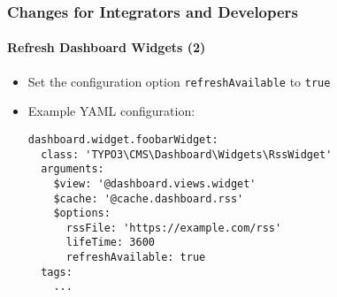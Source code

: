 %

\begin{frame}[fragile]
	\frametitle{Changes for Integrators and Developers}
	\framesubtitle{Refresh Dashboard Widgets (2)}


	\begin{itemize}
		\item Set the configuration option \texttt{refreshAvailable} to \texttt{true}
		\item Example YAML configuration:
\begin{lstlisting}
dashboard.widget.foobarWidget:
  class: 'TYPO3\CMS\Dashboard\Widgets\RssWidget'
  arguments:
    $view: '@dashboard.views.widget'
    $cache: '@cache.dashboard.rss'
    $options:
      rssFile: 'https://example.com/rss'
      lifeTime: 3600
      refreshAvailable: true
  tags:
    ...
\end{lstlisting}

	\end{itemize}

\end{frame}


